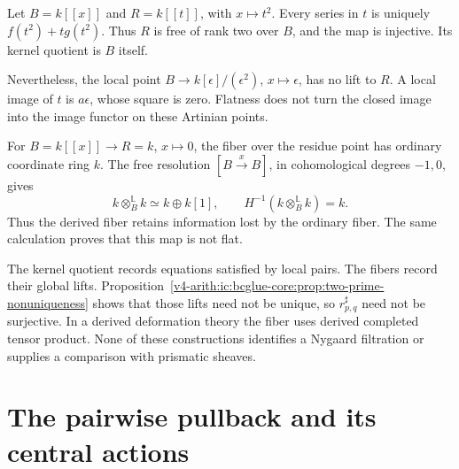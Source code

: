 \begin{example}
\label{v4-arith:ic:bcglue-core:ex:closed-image}
Let $B=k[[x]]$ and $R=k[[t]]$, with $x\mapsto t^2$.
Every series in $t$ is uniquely $f(t^2)+t g(t^2)$.
Thus $R$ is free of rank two over $B$, and the map is injective.
Its kernel quotient is $B$ itself.

Nevertheless, the local point
$B\to k[\epsilon]/(\epsilon^2)$, $x\mapsto\epsilon$, has no lift
to $R$. A local image of $t$ is $a\epsilon$, whose square is zero.
Flatness does not turn the closed image into the image functor
on these Artinian points.
\end{example}

\begin{example}
\label{v4-arith:ic:bcglue-core:ex:derived-fibre}
For $B=k[[x]]\to R=k$, $x\mapsto0$, the fiber over the residue
point has ordinary coordinate ring $k$.
The free resolution $[B\xrightarrow{x}B]$, in cohomological
degrees $-1,0$, gives
\[
 k\otimes_B^{\mathbb L}k\simeq k\oplus k[1],\qquad
 H^{-1}(k\otimes_B^{\mathbb L}k)=k.
\]
Thus the derived fiber retains information lost by the ordinary
fiber. The same calculation proves that this map is not flat.
\end{example}

\begin{remark}
\label{v4-arith:ic:bcglue-core:rem:why-chenevier}
The kernel quotient records equations satisfied by local pairs.
The fibers record their global lifts.
Proposition~\ref{v4-arith:ic:bcglue-core:prop:two-prime-nonuniqueness}
shows that those lifts need not be unique, so
$r_{p,q}^{\sharp}$ need not be surjective.
In a derived deformation theory the fiber uses derived completed
tensor product. None of these constructions identifies a Nygaard
filtration or supplies a comparison with prismatic sheaves.
\end{remark}

\section{The pairwise pullback and its central actions}
\label{v4-arith:ic:bcglue-core:local}

